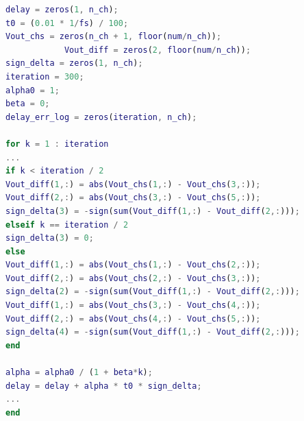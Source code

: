 \documentclass[cs4size,a4paper]{ctexart}
\numberwithin{equation}{section}
\numberwithin{table}{section}
\numberwithin{figure}{section}
\begin{document}
\begin{flushleft}
		\begin{lstlisting}[language=Matlab]
delay = zeros(1, n_ch);
t0 = (0.01 * 1/fs) / 100;
Vout_chs = zeros(n_ch + 1, floor(num/n_ch));
			Vout_diff = zeros(2, floor(num/n_ch));
sign_delta = zeros(1, n_ch);
iteration = 300;
alpha0 = 1;
beta = 0;
delay_err_log = zeros(iteration, n_ch);

for k = 1 : iteration
...
if k < iteration / 2
Vout_diff(1,:) = abs(Vout_chs(1,:) - Vout_chs(3,:));
Vout_diff(2,:) = abs(Vout_chs(3,:) - Vout_chs(5,:));
sign_delta(3) = -sign(sum(Vout_diff(1,:) - Vout_diff(2,:)));
elseif k == iteration / 2
sign_delta(3) = 0;
else
Vout_diff(1,:) = abs(Vout_chs(1,:) - Vout_chs(2,:));
Vout_diff(2,:) = abs(Vout_chs(2,:) - Vout_chs(3,:));
sign_delta(2) = -sign(sum(Vout_diff(1,:) - Vout_diff(2,:)));
Vout_diff(1,:) = abs(Vout_chs(3,:) - Vout_chs(4,:));
Vout_diff(2,:) = abs(Vout_chs(4,:) - Vout_chs(5,:));
sign_delta(4) = -sign(sum(Vout_diff(1,:) - Vout_diff(2,:)));
end

alpha = alpha0 / (1 + beta*k);
delay = delay + alpha * t0 * sign_delta;
...
end
		\end{lstlisting}
\end{flushleft}

		
\end{document}
